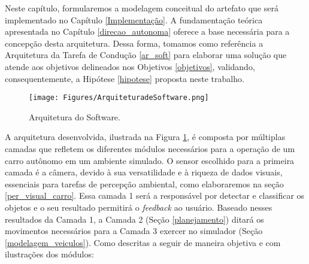 Neste capítulo, formularemos a modelagem conceitual do artefato que será implementado no Capítulo \ref{Implementação}. A fundamentação teórica apresentada no Capítulo \ref{direcao_autonoma} oferece a base necessária para a concepção desta arquitetura. Dessa forma, tomamos como referência a Arquitetura da Tarefa de Condução \ref{ar_soft} para elaborar uma solução que atende aos objetivos delineados nos Objetivos \ref{objetivos}, validando, consequentemente, a Hipótese \ref{hipotese} proposta neste trabalho.
\begin{figure}[H]
\centering
\texttt{[image: Figures/ArquiteturadeSoftware.png]}
\caption{Arquitetura do Software.}
\label{Arquitetura_soft_autor}
\end{figure}
A arquitetura desenvolvida, ilustrada na Figura \ref{Arquitetura_soft_autor}, é composta por múltiplas camadas que refletem os diferentes módulos necessários para a operação de um carro autônomo em um ambiente simulado. O sensor escolhido para a primeira camada é a câmera, devido à sua versatilidade e à riqueza de dados visuais, essenciais para tarefas de percepção ambiental, como elaboraremos na seção \ref{per_visual_carro}. Essa camada 1 será a responsável por detectar e classificar os objetos e o seu resultado permitirá o \textit{feedback} ao usuário. Baseado nesses resultados da Camada 1, a Camada 2 (Seção \ref{planejamento}) ditará os movimentos necessários para a Camada 3 exercer no simulador (Seção \ref{modelagem_veiculos}). Como descritas a seguir de maneira objetiva e com ilustrações dos módulos:
